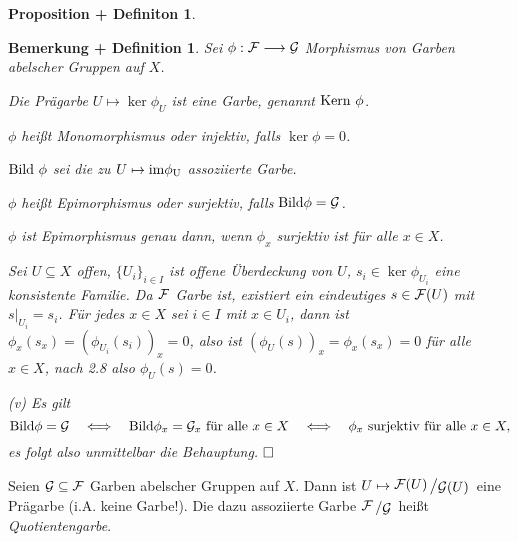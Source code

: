 \documentclass[11pt]{book}
\newtheorem{bemdefini}[theorem]{Bemerkung + Definition}
\newtheorem{propdefini}[theorem]{Proposition + Definiton}
\theoremstyle{nonumberbreak}
\newenvironment{defin}[1][]{\ifthenelse{\equal{#1}{}}{\definition}{\definition[#1]}\rm}{\enddefinition}
\newenvironment{pr}[1][]{\ifthenelse{\equal{#1}{}}{\proof}{\proof[#1]}\rm}{\endproof}
\newcommand{\slant}[2]{{\raisebox{.1em}{$#1$}\left/\raisebox{-.1em}{$#2$}\right.}}
\begin{document}
\begin{spacing}{1.4}
\begin{propdefini}
\end{propdefini}

\begin{bemdefini} %
Sei $\phi: \mathcal{F} \longrightarrow \mathcal{G}$ Morphismus von Garben abelscher Gruppen auf $X$.
\begin{compactenum}
\item Die Prägarbe $U \mapsto \ker \phi_U$ ist eine Garbe, genannt $\rm{Kern}\ \phi$.
\item $\phi$ heißt \textit{Monomorphismus} oder \textit{injektiv}, falls $\ker \phi = 0$.
\item $\rm{Bild} \ \phi$ sei die zu $U \mapsto \rm{im } \phi_U$ assoziierte Garbe.
\item $\phi$ heißt \textit{Epimorphismus} oder \textit{surjektiv}, falls $\rm{Bild} \phi = \mathcal{G}$.
\item $\phi$ ist \textit{Epimorphismus} genau dann, wenn $\phi_x$ surjektiv ist für alle $x \in X$.

\end{compactenum}

\begin{pr}

\begin{compactenum}

\item Sei $U \subseteq X$ offen, $\{U_i\}_{i \in I}$ ist offene Überdeckung von $U$, $s_i \in \ker \phi_{U_i}$ eine konsistente Familie. Da $\mathcal{F}$ Garbe ist, existiert ein eindeutiges $s \in \mathcal{F}(U)$ mit $s \vert_{U_i}= s_i$. Für jedes $x \in X$ sei $i \in I$ mit $x \in U_i$, dann ist $\phi_x(s_x) = \left( \phi_{U_i}(s_i) \right)_x = 0$, also ist $\left( \phi_U(s) \right)_x = \phi_x(s_x) = 0$ für alle $x \in X$, nach 2.8 also $\phi_U(s)=0$. 

\item[(v)] Es gilt
$$\textrm{Bild} \phi = \mathcal{G} \quad \Longleftrightarrow \quad \textrm{Bild} \phi_x = \mathcal{G}_x \textrm{ für alle }x \in X \quad \Longleftrightarrow \quad \phi_x \textrm{ surjektiv für alle } x \in X,$$
es folgt also unmittelbar die Behauptung. $\hfill \Box$

\end{compactenum}

\end{pr}
\end{bemdefini}

\begin{defin}  %
Seien $\mathcal{G} \subseteq \mathcal{F}$ Garben abelscher Gruppen auf $X$. Dann ist $U \mapsto \slant{\F(U)}{\G(U)}$ eine Prägarbe (i.A. keine Garbe!). Die dazu assoziierte Garbe $\slant{\F}{\G}$ heißt \textit{Quotientengarbe}.
\end{defin}


\end{spacing}
\end{document}
